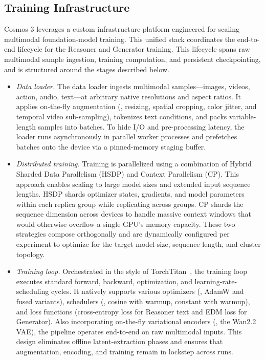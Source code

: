 \subsection{Training Infrastructure}
\label{subsec::training_infrastructure}

Cosmos 3 leverages a custom infrastructure platform engineered for scaling multimodal foundation-model training. This unified stack coordinates the end-to-end lifecycle for the Reasoner and Generator training. This lifecycle spans raw multimodal sample ingestion, training computation, and persistent checkpointing, and is structured around the stages described below.

\begin{itemize}
    \item \textit{Data loader.} The data loader ingests multimodal samples---images, videos, action, audio, text---at arbitrary native resolutions and aspect ratios.  It applies on-the-fly augmentation (\eg, resizing, spatial cropping, color jitter, and temporal video sub-sampling), tokenizes text conditions, and packs variable-length samples into batches. To hide I/O and pre-processing latency, the loader runs asynchronously in parallel worker processes and prefetches batches onto the device via a pinned-memory staging buffer.

    \item \textit{Distributed training.} Training is parallelized using a combination of Hybrid Sharded Data Parallelism (HSDP) and Context Parallelism (CP). This approach enables scaling to large model sizes and extended input sequence lengths. HSDP shards optimizer states, gradients, and model parameters within each replica group while replicating across groups. CP shards the sequence dimension across devices to handle massive context windows that would otherwise overflow a single GPU's memory capacity. These two strategies compose orthogonally and are dynamically configured per experiment to optimize for the target model size, sequence length, and cluster topology.

    \item \textit{Training loop.} Orchestrated in the style of TorchTitan~\citep{torchtitan}, the training loop executes standard forward, backward, optimization, and learning-rate-scheduling cycles. It natively supports various optimizers (\eg, AdamW and fused variants), schedulers (\eg, cosine with warmup, constant with warmup), and loss functions (cross-entropy loss for Reasoner text and EDM loss for Generator). Also incorporating on-the-fly variational encoders (\eg, the Wan2.2 VAE), the pipeline operates end-to-end on raw multimodal inputs. This design eliminates offline latent-extraction phases and ensures that augmentation, encoding, and training remain in lockstep across runs.


\end{itemize}
